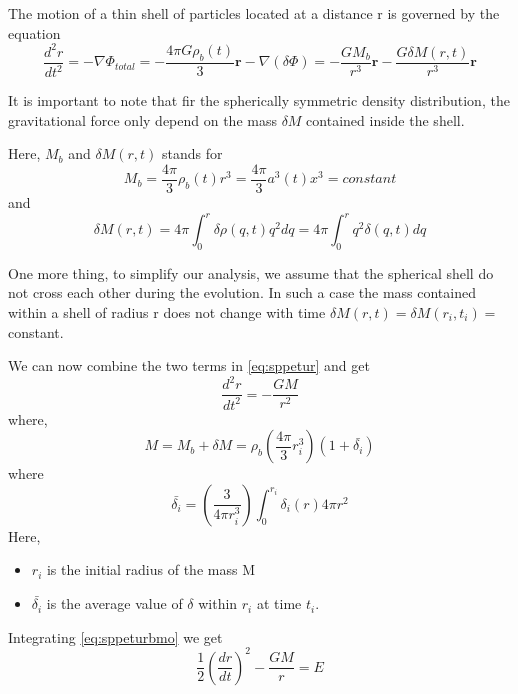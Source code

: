\documentclass[12pt]{report}
\newcommand{\mbf}[1]{\mathbf{#1}}
\newcommand{\cbox}{tcolorbox}
\newcommand{\cc}[1]{\left({#1}\right)}
\begin{document}
The motion of a thin shell of particles located at a distance r is governed by the equation
\begin{equation}\label{eq:sppetur}
\frac{d^2 r}{d t^2}=-\nabla \Phi_{total}=-\frac{4 \pi G \rho_b(t)}{3}\mbf{r}-\nabla(\delta \Phi)=-\frac{GM_b}{r^3}\mbf{r}-\frac{G\delta M(r,t)}{r^3}\mbf{r}
\end{equation}
\begin{\cbox}
It is important to note that fir the spherically symmetric density distribution, the gravitational force only depend on the mass $\delta M$ contained inside the shell.
\end{\cbox} 
 Here, $M_b$ and $\delta M(r,t)$ stands for 
\begin{equation}
M_b=\frac{4\pi}{3}\rho_b(t)r^3=\frac{4\pi}{3}a^3(t)x^3=constant
\end{equation}
and
\begin{equation}
\delta M(r,t)=4\pi \int^r_0 \delta\rho(q,t)q^2dq=4 \pi \int^r_0 q^2 \delta (q,t) dq
\end{equation}
\begin{\cbox}
One more thing, to simplify our analysis, we assume that the spherical shell do not cross each other during the evolution. In such a case the mass contained within a shell of radius r does not change with time $\delta M(r,t)=\delta M(r_i,t_i)=$constant.
\end{\cbox}
 We can now combine the two terms in \eqref{eq:sppetur} and get
 \begin{equation}\label{eq:sppeturbmo}
 \frac{d^2 r}{dt^2}=-\frac{GM }{r^2}
 \end{equation}
 where,
 \begin{equation}
 M=M_b+\delta M=\rho_b\cc{\frac{4\pi}{3}r_i^3}(1+\bar{\delta_i})
 \end{equation}
 where
 \begin{equation*}
 \bar{\delta_i}=\cc{\frac{3}{4\pi r^3_i}}\int^{r_i}_0\delta_i(r) 4 \pi r^2
 \end{equation*}
 Here,
 \begin{itemize}
 \item $r_i$ is the initial radius of the mass M
 \item $\bar{\delta_i}$ is the average value of $\delta$ within $r_i$ at time $t_i$.
 
 \end{itemize}
 Integrating  \eqref{eq:sppeturbmo} we get
 \begin{equation}\label{eq:sppeturbsol}
 \frac{1}{2}\cc{\frac{dr}{dt}}^2-\frac{GM}{r}=E
 \end{equation}
\end{document}

